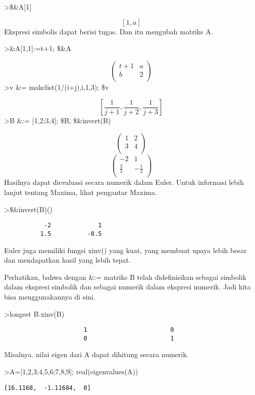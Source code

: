 \documentclass[
]{book}
\begin{document}
\textgreater\$\&A{[}1{]}

\[\left[ 1 , a \right] \]Ekspresi simbolis dapat berisi tugas. Dan itu mengubah matriks A.

\textgreater\&A{[}1,1{]}:=t+1; \$\&A

\[\begin{pmatrix}t+1 & a \\ b & 2 \\ \end{pmatrix}\]\textgreater v \&= makelist(1/(i+j),i,1,3); \$v

\[\left[ \frac{1}{j+1} , \frac{1}{j+2} , \frac{1}{j+3} \right] \]\textgreater B \&:= {[}1,2;3,4{]}; \$B, \$\&invert(B)

\[\begin{pmatrix}1 & 2 \\ 3 & 4 \\ \end{pmatrix}\]\[\begin{pmatrix}-2 & 1 \\ \frac{3}{2} & -\frac{1}{2} \\ 
 \end{pmatrix}\]Hasilnya dapat dievaluasi secara numerik dalam Euler. Untuk informasi lebih lanjut tentang Maxima, lihat pengantar Maxima.

\textgreater\$\&invert(B)()

\begin{verbatim}
           -2             1 
          1.5          -0.5 
\end{verbatim}

Euler juga memiliki fungsi xinv() yang kuat, yang membuat upaya lebih besar dan mendapatkan hasil yang lebih tepat.

Perhatikan, bahwa dengan \&:= matriks B telah didefinisikan sebagai simbolik dalam ekspresi simbolik dan sebagai numerik dalam ekspresi numerik. Jadi kita bisa menggunakannya di sini.

\textgreater longest B.xinv(B)

\begin{verbatim}
                      1                       0 
                      0                       1 
\end{verbatim}

Misalnya. nilai eigen dari A dapat dihitung secara numerik.

\textgreater A={[}1,2,3;4,5,6;7,8,9{]}; real(eigenvalues(A))

\begin{verbatim}
[16.1168,  -1.11684,  0]
\end{verbatim}
\end{document}
